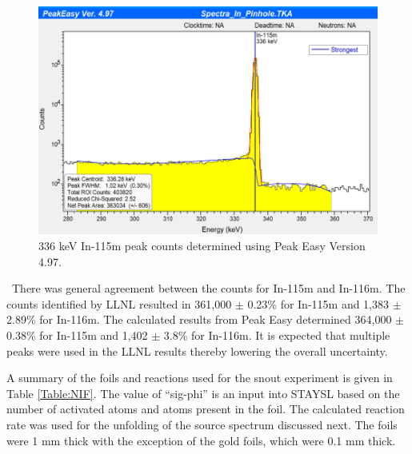 \documentclass[journal]{IEEEtran}
\let\MYoriglatexcaption\caption
\renewcommand{\caption}[2][\relax]{\MYoriglatexcaption[#2]{#2}}
\begin{document}
\begin{figure}[h]
	\includegraphics[width=\linewidth]{Figures/PeakEZ.png}
	\caption{336 keV In-115m peak counts determined using Peak Easy Version 4.97.}
	\label{fig:peakez}
\end{figure}


\ There was general agreement between the counts for In-115m and In-116m. The counts identified by LLNL resulted in 361,000 $\pm$ 0.23\% for In-115m and 1,383 $\pm$ 2.89\% for In-116m. The calculated results from Peak Easy determined 364,000 $\pm$ 0.38\% for In-115m and 1,402 $\pm$ 3.8\% for In-116m. It is expected that multiple peaks were used in the LLNL results thereby lowering the overall uncertainty.

A summary of the foils and reactions used for the snout experiment is given in Table \ref{Table:NIF}. The value of ``sig-phi'' is an input into STAYSL based on the number of activated atoms and atoms present in the foil. The calculated reaction rate was used for the unfolding of the source spectrum discussed next. The foils were 1 mm thick with the exception of the gold foils, which were 0.1 mm thick. 
\end{document}
